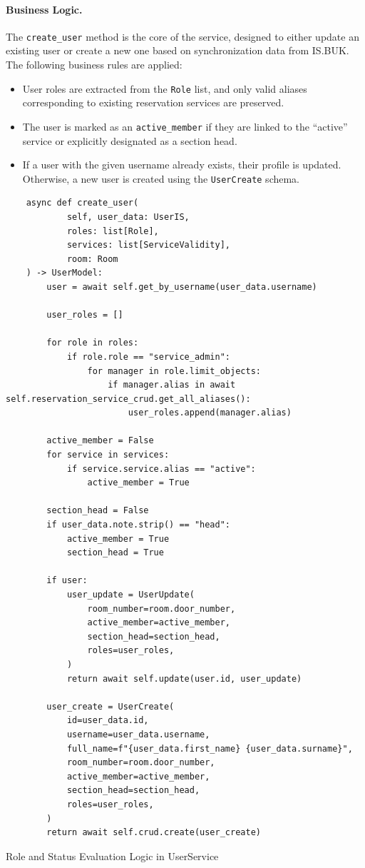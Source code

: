 \paragraph{Business Logic.}
The \texttt{create\_user} method is the core of the service, designed to either update an existing user or create a new one based on synchronization data from IS.BUK. The following business rules are applied:

\begin{itemize}
  \item User roles are extracted from the \texttt{Role} list, and only valid aliases corresponding to existing reservation services are preserved.
  \item The user is marked as an \texttt{active\_member} if they are linked to the ``active'' service or explicitly designated as a section head.
  \item If a user with the given username already exists, their profile is updated. Otherwise, a new user is created using the \texttt{UserCreate} schema.
\end{itemize}

\begin{listing}
  \begin{verbatim}
    async def create_user(
            self, user_data: UserIS,
            roles: list[Role],
            services: list[ServiceValidity],
            room: Room
    ) -> UserModel:
        user = await self.get_by_username(user_data.username)

        user_roles = []

        for role in roles:
            if role.role == "service_admin":
                for manager in role.limit_objects:
                    if manager.alias in await self.reservation_service_crud.get_all_aliases():
                        user_roles.append(manager.alias)

        active_member = False
        for service in services:
            if service.service.alias == "active":
                active_member = True

        section_head = False
        if user_data.note.strip() == "head":
            active_member = True
            section_head = True

        if user:
            user_update = UserUpdate(
                room_number=room.door_number,
                active_member=active_member,
                section_head=section_head,
                roles=user_roles,
            )
            return await self.update(user.id, user_update)

        user_create = UserCreate(
            id=user_data.id,
            username=user_data.username,
            full_name=f"{user_data.first_name} {user_data.surname}",
            room_number=room.door_number,
            active_member=active_member,
            section_head=section_head,
            roles=user_roles,
        )
        return await self.crud.create(user_create)
  \end{verbatim}
  \caption{Role and Status Evaluation Logic in UserService}
  \label{list:user-service-logic}
\end{listing}

